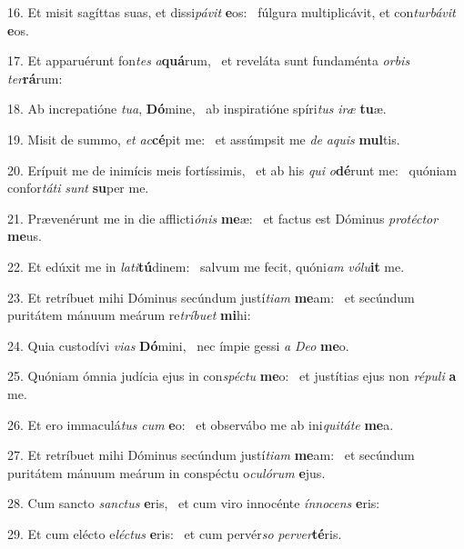 16. Et misit sagíttas suas, et dissi\textit{pá}\textit{vit} \textbf{e}os: \ast\  fúlgura multiplicávit, et con\textit{tur}\textit{bá}\textit{vit} \textbf{e}os.\

17. Et apparuérunt fon\textit{tes} \textit{a}\textbf{quá}rum, \ast\  et reveláta sunt fundaménta \textit{or}\textit{bis} \textit{ter}\textbf{rá}rum:\

18. Ab increpatióne \textit{tu}\textit{a}, \textbf{Dó}mine, \ast\  ab inspiratióne spíri\textit{tus} \textit{i}\textit{ræ} \textbf{tu}æ.\

19. Misit de summo, \textit{et} \textit{ac}\textbf{cé}pit me: \ast\  et assúmpsit me \textit{de} \textit{a}\textit{quis} \textbf{mul}tis.\

20. Erípuit me de inimícis meis fortíssimis, \dag\  et ab his \textit{qui} \textit{o}\textbf{dé}runt me: \ast\  quóniam confor\textit{tá}\textit{ti} \textit{sunt} \textbf{su}per me.\

21. Prævenérunt me in die afflicti\textit{ó}\textit{nis} \textbf{me}æ: \ast\  et factus est Dóminus \textit{pro}\textit{téc}\textit{tor} \textbf{me}us.\

22. Et edúxit me in \textit{la}\textit{ti}\textbf{tú}dinem: \ast\  salvum me fecit, quóni\textit{am} \textit{vó}\textit{lu}\textbf{it} me.\

23. Et retríbuet mihi Dóminus secúndum justí\textit{ti}\textit{am} \textbf{me}am: \ast\  et secúndum puritátem mánuum meárum re\textit{trí}\textit{bu}\textit{et} \textbf{mi}hi:\

24. Quia custodívi \textit{vi}\textit{as} \textbf{Dó}mini, \ast\  nec ímpie gessi \textit{a} \textit{De}\textit{o} \textbf{me}o.\

25. Quóniam ómnia judícia ejus in con\textit{spéc}\textit{tu} \textbf{me}o: \ast\  et justítias ejus non \textit{ré}\textit{pu}\textit{li} \textbf{a} me.\

26. Et ero immaculá\textit{tus} \textit{cum} \textbf{e}o: \ast\  et observábo me ab ini\textit{qui}\textit{tá}\textit{te} \textbf{me}a.\

27. Et retríbuet mihi Dóminus secúndum justí\textit{ti}\textit{am} \textbf{me}am: \ast\  et secúndum puritátem mánuum meárum in conspéctu o\textit{cu}\textit{ló}\textit{rum} \textbf{e}jus.\

28. Cum sancto \textit{sanc}\textit{tus} \textbf{e}ris, \ast\  et cum viro innocénte \textit{ín}\textit{no}\textit{cens} \textbf{e}ris:\

29. Et cum elécto e\textit{léc}\textit{tus} \textbf{e}ris: \ast\  et cum pervér\textit{so} \textit{per}\textit{ver}\textbf{té}ris.\

